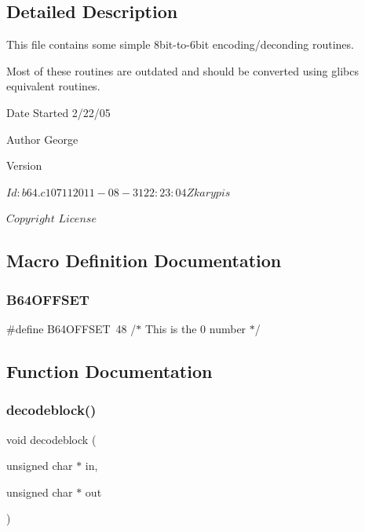 \subsection{Detailed Description}
This file contains some simple 8bit-\/to-\/6bit encoding/deconding routines. 

Most of these routines are outdated and should be converted using glibc\textquotesingle{}s equivalent routines.

\begin{DoxyDate}{Date}
Started 2/22/05 
\end{DoxyDate}
\begin{DoxyAuthor}{Author}
George 
\end{DoxyAuthor}
\begin{DoxyVersion}{Version}
\begin{DoxyVerb}$Id: b64.c 10711 2011-08-31 22:23:04Z karypis $ \end{DoxyVerb}

\end{DoxyVersion}
\begin{DoxyVerb}$Copyright$ 
$License$
\end{DoxyVerb}
 

\subsection{Macro Definition Documentation}
\mbox{\label{a00014_a02bce60efacf71903875f4ad8e01b2f8}} 
\subsubsection{\texorpdfstring{B64\+O\+F\+F\+S\+ET}{B64OFFSET}}
{\footnotesize\ttfamily \#define B64\+O\+F\+F\+S\+ET~48      /$\ast$ This is the \textquotesingle{}0\textquotesingle{} number $\ast$/}



\subsection{Function Documentation}
\mbox{\label{a00014_a16b79810a7cfac6a5bc729e7bea80f7b}} 
\subsubsection{\texorpdfstring{decodeblock()}{decodeblock()}}
{\footnotesize\ttfamily void decodeblock (\begin{DoxyParamCaption}\item[{unsigned char $\ast$}]{in,  }\item[{unsigned char $\ast$}]{out }\end{DoxyParamCaption})}

